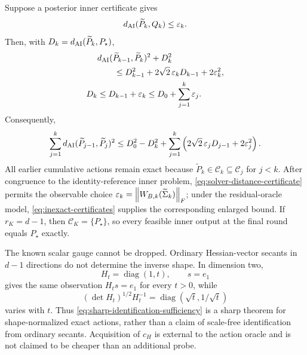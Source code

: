 \begin{theorem}
\label{thm:approximate-multisecant}
Suppose a posterior inner certificate gives
\begin{equation}
  d_{\mathrm{AI}}(\widetilde P_k,Q_k)\le\varepsilon_k.
  \label{eq:inner-projection-certificate}
\end{equation}
Then, with \(D_k=d_{\mathrm{AI}}(\widetilde P_k,P_\star)\),
\begin{align}
  &d_{\mathrm{AI}}(\widetilde P_{k-1},\widetilde P_k)^2+D_k^2
  \nonumber\\
  &\qquad\le D_{k-1}^2
  +2\sqrt2\,\varepsilon_kD_{k-1}+2\varepsilon_k^2,
  \label{eq:approximate-multisecant-pythagorean}\\
  D_k&\le D_{k-1}+\varepsilon_k
  \le D_0+\sum_{j=1}^k\varepsilon_j.
  \label{eq:approximate-multisecant-distance}
\end{align}
Consequently,
\begin{equation}
  \sum_{j=1}^k
  d_{\mathrm{AI}}(\widetilde P_{j-1},\widetilde P_j)^2
  \le D_0^2-D_k^2
  +\sum_{j=1}^k
   \left(2\sqrt2\,\varepsilon_jD_{j-1}+2\varepsilon_j^2\right).
  \label{eq:approximate-multisecant-energy}
\end{equation}
All earlier cumulative actions remain exact because
\(\widetilde P_k\in\mathscr C_k\subseteq\mathscr C_j\) for \(j<k\).
After congruence to the identity-reference inner problem,
\cref{eq:solver-distance-certificate} permits the observable choice
\(\varepsilon_k=\left\lVert W_{B,k}(\widetilde\Sigma_k)\right\rVert_F\); under the residual-oracle
model, \cref{eq:inexact-certificates} supplies the corresponding enlarged
bound.  If \(r_K=d-1\), then \(\mathscr C_K=\{P_\star\}\), so every feasible
inner output at the final round equals \(P_\star\) exactly.
\end{theorem}

The known scalar gauge cannot be dropped.  Ordinary Hessian-vector secants in
\(d-1\) directions do not determine the inverse shape.  In dimension two,
\[
  H_t=\operatorname{diag}(1,t),\qquad s=e_1
\]
gives the same observation \(H_ts=e_1\) for every \(t>0\), while
\[
  (\det H_t)^{1/2}H_t^{-1}
  =\operatorname{diag}(\sqrt t,1/\sqrt t)
\]
varies with \(t\).  Thus \eqref{eq:sharp-identification-sufficiency} is a
sharp theorem for shape-normalized exact actions, rather than a claim of
scale-free identification from ordinary secants.  Acquisition of \(c_H\) is
external to the action oracle and is not claimed to be cheaper than an
additional probe.
